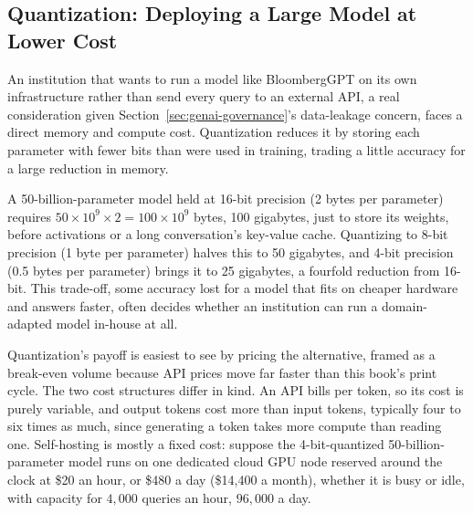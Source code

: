 \documentclass[../ai_in_finance]{subfiles}
\begin{document}
\subsection{Quantization: Deploying a Large Model at Lower Cost}
\label{sec:quantization}

An institution that wants to run a model like BloombergGPT on its own infrastructure rather than send every query to an external API, a real consideration given Section~\ref{sec:genai-governance}'s data-leakage concern, faces a direct memory and compute cost. Quantization reduces it by storing each parameter with fewer bits than were used in training, trading a little accuracy for a large reduction in memory.

A 50-billion-parameter model held at 16-bit precision (2 bytes per parameter) requires $50\times10^9 \times 2 = 100\times10^9$ bytes, 100 gigabytes, just to store its weights, before activations or a long conversation's key-value cache. Quantizing to 8-bit precision (1 byte per parameter) halves this to 50 gigabytes, and 4-bit precision (0.5 bytes per parameter) brings it to 25 gigabytes, a fourfold reduction from 16-bit. This trade-off, some accuracy lost for a model that fits on cheaper hardware and answers faster, often decides whether an institution can run a domain-adapted model in-house at all.

\label{sec:api-vs-selfhost}
Quantization's payoff is easiest to see by pricing the alternative, framed as a break-even volume because API prices move far faster than this book's print cycle. The two cost structures differ in kind. An API bills per token, so its cost is purely variable, and output tokens cost more than input tokens, typically four to six times as much, since generating a token takes more compute than reading one. Self-hosting is mostly a fixed cost: suppose the 4-bit-quantized 50-billion-parameter model runs on one dedicated cloud GPU node reserved around the clock at \$20 an hour, or \$480 a day (\$14,400 a month), whether it is busy or idle, with capacity for $4{,}000$ queries an hour, $96{,}000$ a day.
\end{document}
